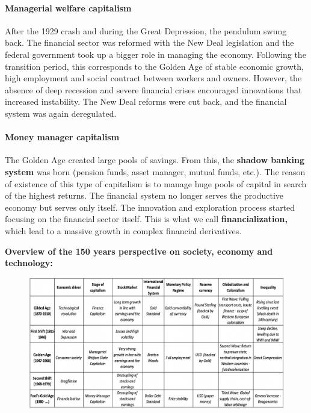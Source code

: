 \documentclass[a4paper]{extarticle}
\begin{document}
\paragraph{Managerial welfare capitalism} After the 1929 crash and during the Great Depression, the pendulum swung back. The financial sector was reformed with the New Deal legislation and the federal government took up a bigger role in managing the economy. Following the transition period, this corresponds to the Golden Age of stable economic growth, high employment and social contract between workers and owners. However, the absence of deep recession and severe financial crises encouraged innovations that increased instability. The New Deal reforms were cut back, and the financial system was again deregulated.

\paragraph{Money manager capitalism} The Golden Age created large pools of savings. From this, the \textbf{shadow banking system} was born (pension funds, asset manager, mutual funds, etc.). The reason of existence of this type of capitalism is to manage huge pools of capital in search of the highest returns. The financial system no longer serves the productive economy but serves only itself. The innovation and exploration process started focusing on the financial sector itself. This is what we call \textbf{financialization,} which lead to a massive growth in complex financial derivatives.

\textbf{Overview of the 150 years perspective on society, economy and technology:}

\begin{figure}[H]
    \includegraphics[width=15cm]{../images/EnpRisk_Fig10-1}
    \centering
\end{figure}
\end{document}
